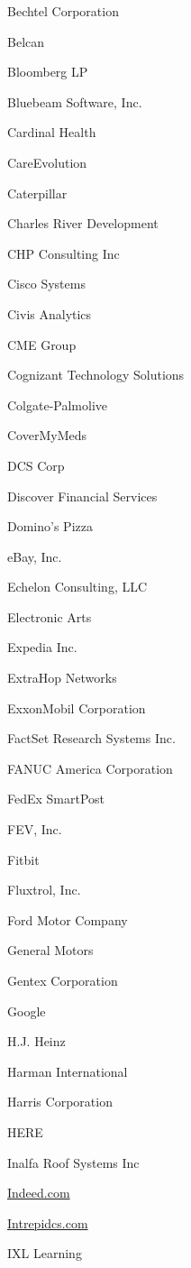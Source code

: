 \documentclass[twoside]{article}
\begin{document}
\begin{center}
\begin{multicols}{5}
\begin{FlushLeft}
\begin{compactitem}
\item Bechtel Corporation
\item Belcan
\item Bloomberg LP
\item Bluebeam Software, Inc.
\item Cardinal Health
\item CareEvolution
\item Caterpillar
\item Charles River Development
\item CHP Consulting Inc
\item Cisco Systems
\item Civis Analytics
\item CME Group
\item Cognizant Technology Solutions
\item Colgate-Palmolive
\item CoverMyMeds
\item DCS Corp
\item Discover Financial Services
\item Domino's Pizza
\item eBay, Inc.
\item Echelon Consulting, LLC
\item Electronic Arts
\item Expedia Inc.
\item ExtraHop Networks
\item ExxonMobil Corporation
\item FactSet Research Systems Inc.
\item FANUC America Corporation
\item FedEx SmartPost
\item FEV, Inc.
\item Fitbit
\item Fluxtrol, Inc.
\item Ford Motor Company
\item General Motors
\item Gentex Corporation
\item Google
\item H.J. Heinz
\item Harman International
\item Harris Corporation
\item HERE
\item Inalfa Roof Systems Inc
\item \url{Indeed.com}
\item \url{Intrepidcs.com}
\item IXL Learning

\end{compactitem}
\end{FlushLeft}
\end{multicols}
\end{center}
\end{document}
